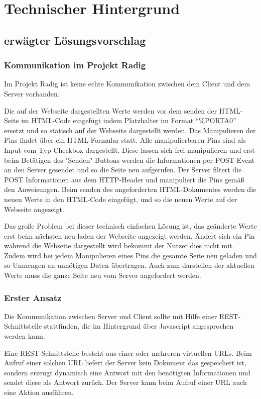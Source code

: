 \chapter{Technischer Hintergrund}

\section{erwägter Lösungsvorschlag}

\subsection{Kommunikation im Projekt Radig}
Im Projekt Radig ist keine echte Kommunikation zwischen dem Client und dem Server
vorhanden.

Die auf der Webseite dargestellten Werte werden vor dem senden der HTML-Seite
im HTML-Code eingefügt indem Platzhalter im Format "`\%PORTA0"' ersetzt und so statisch auf
der Webseite dargestellt werden. Das Manipulieren der Pins findet über ein HTML-Formular
statt. Alle manipulierbaren Pins sind als Input vom Typ Checkbox dargestellt. Diese lassen
sich frei manipulieren und erst beim Betätigen des "Senden"-Buttons werden die
Informationen per POST-Event an den Server gesendet und so die Seite neu aufgerufen. Der
Server filtert die POST Informationen aus dem HTTP-Header und manipuliert die Pins gemäß
den Anweisungen. Beim senden des angeforderten HTML-Dokumentes werden die neuen Werte in
den HTML-Code eingefügt, und so die neuen Werte auf der Webseite angezeigt.

Das große Problem bei dieser technisch einfachen Lösung ist, das geänderte Werte erst beim
nächsten neu laden der Webseite angezeigt werden. Ändert sich ein Pin während die Webseite
dargestellt wird bekommt der Nutzer dies nicht mit. Zudem wird bei jedem Manipulieren
eines Pins die gesamte Seite neu geladen und so Unmengen an unnötigen Daten übertragen.
Auch zum darstellen der aktuellen Werte muss die ganze Seite neu vom Server angefordert
werden.

\subsection{Erster Ansatz}
Die Kommunikation zwischen Server und Client sollte mit Hilfe einer REST-Schnittstelle
stattfinden, die im Hintergrund über Javascript angesprochen werden kann.

Eine REST-Schnittstelle besteht aus einer oder mehreren virtuellen URLs. Beim Aufruf einer
solchen URL liefert der Server kein Dokument das gespeichert ist, sondern erzeugt
dynamisch eine Antwort mit den benötigten Informationen und sendet diese als Antwort
zurück. Der Server kann beim Aufruf einer URL auch eine Aktion ausführen.

